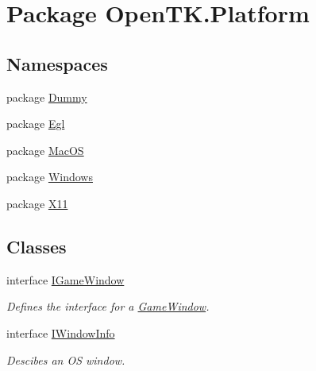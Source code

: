 \hypertarget{namespace_open_t_k_1_1_platform}{\section{Package Open\-T\-K.\-Platform}
\label{namespace_open_t_k_1_1_platform}
}
\subsection*{Namespaces}
\begin{DoxyCompactItemize}
\item 
package \hyperlink{namespace_open_t_k_1_1_platform_1_1_dummy}{Dummy}
\item 
package \hyperlink{namespace_open_t_k_1_1_platform_1_1_egl}{Egl}
\item 
package \hyperlink{namespace_open_t_k_1_1_platform_1_1_mac_o_s}{Mac\-O\-S}
\item 
package \hyperlink{namespace_open_t_k_1_1_platform_1_1_windows}{Windows}
\item 
package \hyperlink{namespace_open_t_k_1_1_platform_1_1_x11}{X11}
\end{DoxyCompactItemize}
\subsection*{Classes}
\begin{DoxyCompactItemize}
\item 
interface \hyperlink{interface_open_t_k_1_1_platform_1_1_i_game_window}{I\-Game\-Window}
\begin{DoxyCompactList}\small\item\em Defines the interface for a \hyperlink{class_open_t_k_1_1_game_window}{Game\-Window}. \end{DoxyCompactList}\item 
interface \hyperlink{interface_open_t_k_1_1_platform_1_1_i_window_info}{I\-Window\-Info}
\begin{DoxyCompactList}\small\item\em Descibes an O\-S window.\end{DoxyCompactList}\end{DoxyCompactItemize}
